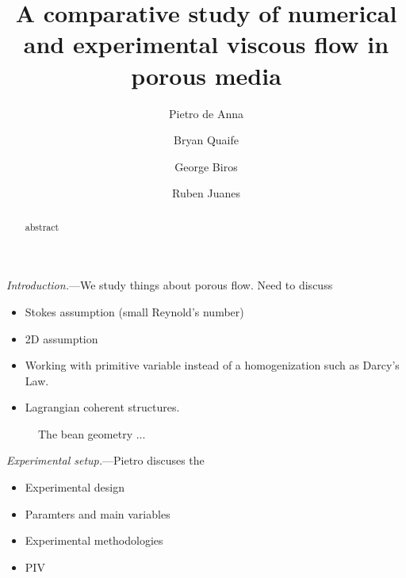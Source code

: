 \documentclass[twocolumn,showpacs,pre,preprintnumbers,floatfix]{revtex4-1}
\newif\ifTikz
\begin{document}
\title{A comparative study of numerical and experimental viscous flow
in porous media}

\author{Pietro de Anna}
\author{Bryan Quaife}
\author{George Biros}
\author{Ruben Juanes}

\begin{abstract}
abstract
\end{abstract}

\maketitle

{\em Introduction.}---We study things about porous flow.  Need to
discuss
\begin{itemize}
  \item Stokes assumption (small Reynold's number)
  \item 2D assumption
  \item Working with primitive variable instead of a homogenization such
  as Darcy's Law.
  \item Lagrangian coherent structures.
\end{itemize}
\begin{figure}[htps]
\ifTikz

\fi
\caption{\label{f:beans} The bean geometry ...}
\end{figure}


{\em Experimental setup.}---Pietro discuses the
\begin{itemize}
  \item Experimental design
  \item Paramters and main variables
  \item Experimental methodologies
  \item PIV
\end{itemize}
\end{document}
